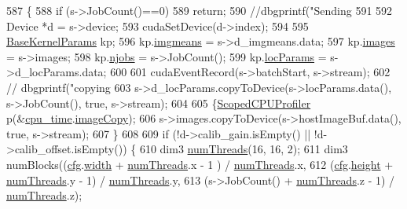 \begin{DoxyCode}
587 \{
588     \textcolor{keywordflow}{if} (s->JobCount()==0)
589         \textcolor{keywordflow}{return};
590     \textcolor{comment}{//dbgprintf("Sending %
591 
592     Device *d = s->device;
593     cudaSetDevice(d->index);
594 
595     \hyperlink{struct_base_kernel_params}{BaseKernelParams} kp;
596     kp.\hyperlink{struct_base_kernel_params_aa0c58be6d25ab55207ca83bb0047f4d9}{imgmeans} = s->d\_imgmeans.data;
597     kp.\hyperlink{struct_base_kernel_params_abdd6b8722cb871a13069ba0e3cd3ab0b}{images} = s->images;
598     kp.\hyperlink{struct_base_kernel_params_aec40d44810d0e0a6640c66038af1fbf2}{njobs} = s->JobCount();
599     kp.\hyperlink{struct_base_kernel_params_a199494e0d0548c8b69ee23350e6ece95}{locParams} = s->d\_locParams.data;
600 
601     cudaEventRecord(s->batchStart, s->stream);
602 \textcolor{comment}{//  dbgprintf("copying %
603     s->d\_locParams.copyToDevice(s->locParams.data(), s->JobCount(), \textcolor{keyword}{true}, s->stream);
604 
605     \{\hyperlink{class_scoped_c_p_u_profiler}{ScopedCPUProfiler} p(&\hyperlink{class_queued_c_u_d_a_tracker_ae8b2eeef65a2a1acde697df6c206ae08}{cpu\_time}.\hyperlink{struct_queued_c_u_d_a_tracker_1_1_kernel_profile_time_a04abd82cbcc70357b2a2901f490a1662}{imageCopy});
606         s->images.copyToDevice(s->hostImageBuf.data(), \textcolor{keyword}{true}, s->stream); 
607     \}
608 
609     \textcolor{keywordflow}{if} (!d->calib\_gain.isEmpty() || !d->calib\_offset.isEmpty()) \{
610         dim3 \hyperlink{class_queued_c_u_d_a_tracker_a1bbaf466f197bd745411786578b743bc}{numThreads}(16, 16, 2);
611         dim3 numBlocks((\hyperlink{class_queued_tracker_afb847e7f49e0af6027d58af51d5914dc}{cfg}.\hyperlink{struct_q_trk_settings_aef24eb3a4692bd67ff1aca8ef950e08d}{width} + \hyperlink{class_queued_c_u_d_a_tracker_a1bbaf466f197bd745411786578b743bc}{numThreads}.x - 1 ) / 
      \hyperlink{class_queued_c_u_d_a_tracker_a1bbaf466f197bd745411786578b743bc}{numThreads}.x,
612                 (\hyperlink{class_queued_tracker_afb847e7f49e0af6027d58af51d5914dc}{cfg}.\hyperlink{struct_q_trk_settings_a94c965d103e7a0a4f1fced8eee1324ce}{height} + \hyperlink{class_queued_c_u_d_a_tracker_a1bbaf466f197bd745411786578b743bc}{numThreads}.y - 1) / \hyperlink{class_queued_c_u_d_a_tracker_a1bbaf466f197bd745411786578b743bc}{numThreads}.y,
613                 (s->JobCount() + \hyperlink{class_queued_c_u_d_a_tracker_a1bbaf466f197bd745411786578b743bc}{numThreads}.z - 1) / \hyperlink{class_queued_c_u_d_a_tracker_a1bbaf466f197bd745411786578b743bc}{numThreads}.z);
}}
\end{DoxyCode}
